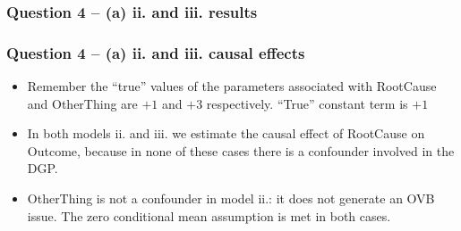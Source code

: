 \documentclass[xcolor=table]{beamer}
\begin{document}
\begin{frame}
\frametitle{Question 4 -- (a) ii. and iii. results}
\begin{table}[!htbp] 
\centering 
{}
\end{table} 
\end{frame}

\begin{frame}
\frametitle{Question 4 -- (a) ii. and iii. causal effects}
\begin{itemize}
\item Remember the ``true'' values of the parameters associated with RootCause and OtherThing are $+1$ and $+3$ respectively. ``True'' constant term is $+1$ \pause

\item In both models ii. and iii. we estimate the causal effect of RootCause on Outcome, because in none of these cases there is a confounder involved in the DGP. \pause 

\item OtherThing is not a confounder in model ii.: it does not generate an OVB issue. \pause The zero conditional mean assumption is met in both cases.
\end{itemize}
\end{frame}
\end{document}
